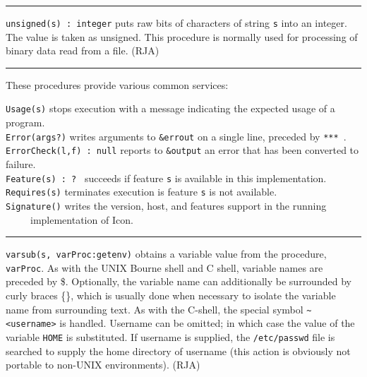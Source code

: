 \vspace{0.25cm}\hrule{}

\texttt{unsigned(s) : integer} puts raw bits of characters of string
\texttt{s} into an integer. The value is taken as unsigned. This
procedure is normally used for processing of binary data read from a
file. (RJA)

\vspace{0.25cm}\hrule{}

These procedures provide various common services: 

\texttt{Usage(s)} stops execution with a message
indicating the expected usage of a program.\\
\texttt{Error(args?)} writes arguments to \texttt{\&errout} on a single
line, preceded by \texttt{{\textquotedbl}*** {\textquotedbl}}.\\
\texttt{ErrorCheck(l,f) : null} reports to \texttt{\&output} an error
that has been converted to failure.\\
\texttt{Feature(s)}\texttt{ : ?} \ succeeds if feature
\texttt{s} is available in this implementation.\\
\texttt{Requires(s)} terminates execution is feature \texttt{s} is not
available.\\
\texttt{Signature()} writes the version, host, and features support in
the running\\
 \ \ \ \ \ implementation of Icon. 

\vspace{0.25cm}\hrule{}

\texttt{varsub(s, varProc:getenv)} obtains a variable value from the
procedure, \texttt{varProc}. As with the UNIX Bourne shell and C shell,
variable names are preceded by \$. Optionally, the variable name can
additionally be surrounded by curly braces \{\}, which is usually done
when necessary to isolate the variable name from surrounding text. As
with the C-shell, the special symbol
\texttt{\~{}{\textless}username{\textgreater}} is handled. Username can
be omitted; in which case the value of the variable \texttt{HOME} is
substituted. If username is supplied, the \texttt{/etc/passwd} file is
searched to supply the home directory of username (this action is
obviously not portable to non-UNIX environments). (RJA)

